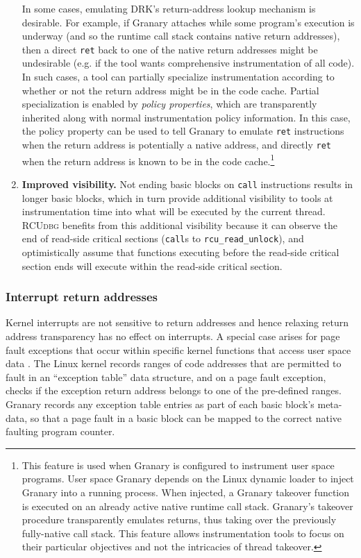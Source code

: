 \documentclass[preprint]{sigplanconf}
\newcommand{\toolname}[1]{{\scshape #1}}
\begin{document}
\begin{enumerate}
In some cases, emulating DRK's return-address lookup mechanism is desirable. For example, if Granary attaches while some program's execution is underway (and so the runtime call stack contains native return addresses), then a direct \texttt{ret} back to one of the native return addresses might be undesirable (e.g. if the tool wants comprehensive instrumentation of all code). In such cases, a tool can partially specialize instrumentation according to whether or not the return address might be in the code cache. Partial specialization is enabled by \emph{policy properties}, which are transparently inherited along with normal instrumentation policy information. In this case, the policy property can be used to tell Granary to emulate \texttt{ret} instructions when the return address is potentially a native address, and directly \texttt{ret} when the return address is known to be in the code cache.\footnote{This feature is used when Granary is configured to instrument user space programs. User space Granary depends on the Linux dynamic loader to inject Granary into a running process. When injected, a Granary takeover function is executed on an already active native runtime call stack. Granary's takeover procedure transparently emulates returns, thus taking over the previously fully-native call stack. This feature allows instrumentation tools to focus on their particular objectives and not the intricacies of thread takeover.}

	\item {\bf Improved visibility.} Not ending basic blocks on \texttt{call} instructions results in longer basic blocks, which in turn provide additional visibility to tools at instrumentation time into what will be executed by the current thread. \toolname{RCUdbg} benefits from this additional visibility because it can observe the end of read-side critical sections (\texttt{call}s to \texttt{rcu\_read\_unlock}), and optimistically assume that functions executing before the read-side critical section ends will execute within the read-side critical section.

\end{enumerate}

\subsubsection{Interrupt return addresses}\label{sec:interrupt_return_address_transparency}
Kernel interrupts are not sensitive to return addresses and hence relaxing return address transparency has no effect on interrupts. A special case arises for page fault exceptions that occur within specific kernel functions that access user space data \cite{btkernel}. The Linux kernel records ranges of code addresses that are permitted to fault in an ``exception table'' data structure, and on a page fault exception, checks if the exception return address belongs to one of the pre-defined ranges. Granary records any exception table entries as part of each basic block's meta-data, so that a page fault in a basic block can be mapped to the correct native faulting program counter.
\end{document}
